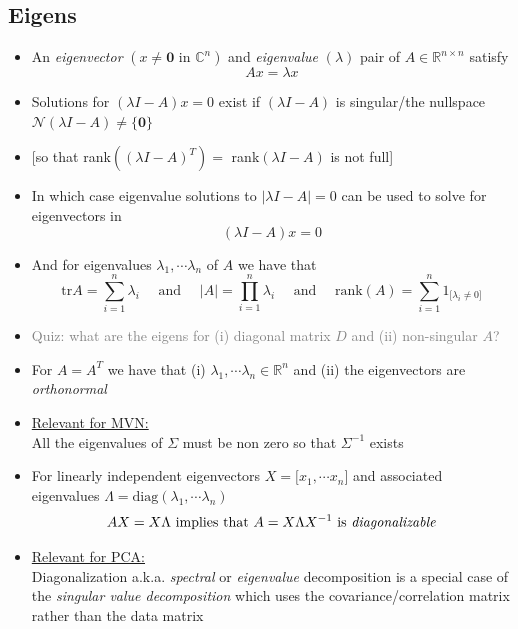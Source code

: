 \documentclass[11pt, oneside]{article}
\begin{document}
\subsection{Eigens}

\begin{itemize}
\item An \emph{eigenvector} $\left(x \not = \textbf{0} \textrm{ in } \mathbb{C}^n\right)$ and
\emph{eigenvalue} $(\lambda)$ pair of $A \in \mathbb{R}^{n\times n}$ satisfy 
$$Ax = \lambda x$$ 
\item Solutions for $(\lambda I - A) x = 0$ exist if $(\lambda I - A)$ is singular/the nullspace $\mathcal{N}(\lambda I - A) \not = \{\textbf{0}\}$  
\item[]\hspace{15.5em}[so that rank$\left((\lambda I - A)^T\right)= $ rank$\left(\lambda I - A\right)$ is not full] \\
\item In which case eigenvalue solutions to $|\lambda I - A| = 0$ can be used to solve for eigenvectors in 
$$(\lambda I - A) x = 0$$
\item And for eigenvalues $\lambda_1,\cdots \lambda_n$ of $A$ we have that  
$$ \textrm{tr}A = \sum_{i=1}^n \lambda_i \quad \textrm{ and } \quad |A| = \prod_{i=1}^n \lambda_i
\quad \textrm{ and } \quad \textrm{rank}(A) = \sum_{i=1}^n 1_{{[}\lambda_i\not=0{]}}$$

\item \textcolor{gray}{Quiz: what are the eigens for (i) diagonal matrix $D$ and (ii) non-singular $A$?}
\item For $A = A^T$ we have that (i) $\lambda_1,\cdots \lambda_n \in \mathbb{R}^n$  and (ii)
the eigenvectors are \emph{orthonormal} 
\item[] \underline{Relevant for MVN:} \\
All the eigenvalues of $\Sigma$ must be non zero so that $\Sigma^{-1}$ exists 
\item For linearly independent eigenvectors $X = {[}x_1,\cdots x_n{]}$ and 
associated eigenvalues $\Lambda = \textrm{diag}(\lambda_1,\cdots \lambda_n)$ 
$$AX = X\Lambda \textrm{ implies that } A = X\Lambda X^{-1} \textrm{ is \emph{diagonalizable}}$$ 
\item[] \underline{Relevant for PCA:} \\
Diagonalization a.k.a. \emph{spectral} or \emph{eigenvalue} decomposition 
is a special case of the \emph{singular value decomposition} which uses the covariance/correlation matrix rather than the data matrix 


\end{itemize}
\end{document}
